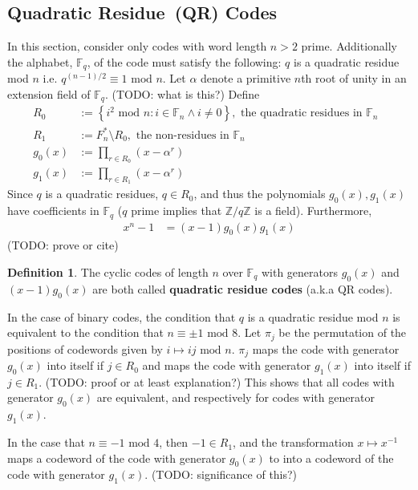 \documentclass{article}
\renewcommand{\tt}[1]{\text{ #1 }}
\newcommand{\Z}{\mathbb{Z}}
\newcommand{\F}{\mathbb{F}}
\renewcommand{\mod}{\text{ mod }}
\newcommand{\mt}{\mapsto}
\renewcommand{\=}{\equiv}
\renewcommand{\i}{^{-1}}
\newcommand{\set}[1]{\left\{ #1 \right\}}
\theoremstyle{plain}
\theoremstyle{definition}
\newtheorem{defn}{Definition}[subsection]
\newcommand{\TODO}[1]{(TODO: #1)}
\begin{document}
\subsection{Quadratic Residue (QR) Codes}

In this section, consider only codes with word length $n > 2$ prime.
Additionally the alphabet, $\F_q$, of the code must satisfy the following: $q$ is a quadratic residue mod $n$ i.e. $q^{(n-1)/2} \= 1 \mod n$.
Let $\alpha$ denote a primitive $n$th root of unity in an extension field of $\F_q$. \TODO{what is this?}
Define
\begin{align}
  R_0 &:= \set{ i^2 \mod n : i \in \F_n \land i \neq 0 }, \tt{the quadratic residues in $\F_n$} \\
  R_1 &:= F_n^* \setminus R_0, \tt{the non-residues in $\F_n$} \\
  g_0(x) &:= \prod_{r \in R_0} (x - \alpha^r) \\
  g_1(x) &:= \prod_{r \in R_1} (x - \alpha^r)
\end{align}
Since $q$ is a quadratic residues, $q \in R_0$, and thus the polynomials $g_0(x), g_1(x)$ have coefficients in $\F_q$ ($q$ prime implies that $\Z/q\Z$ is a field).
Furthermore,
\begin{align}
  x^n - 1 &= (x-1) g_0(x) g_1(x)
\end{align}
\TODO{prove or cite}

\begin{defn}
  The cyclic codes of length $n$ over $\F_q$ with generators $g_0(x)$ and $(x-1)g_0(x)$ are both called \textbf{quadratic residue codes} (a.k.a QR codes).
\end{defn}

In the case of binary codes, the condition that $q$ is a quadratic residue mod $n$ is equivalent to the condition that $n \= \pm 1 \mod 8$.
Let $\pi_{j}$ be the permutation of the positions of codewords given by $i \mt ij \mod n$.
$\pi_j$ maps the code with generator $g_0(x)$ into itself if $j \in R_0$ and maps the code with generator $g_1(x)$ into itself if $j \in R_1$.
\TODO{proof or at least explanation?}
This shows that all codes with generator $g_0(x)$ are equivalent, and respectively for codes with generator $g_1(x)$.

In the case that $n \= -1 \mod 4$, then $-1 \in R_1$, and the transformation $x \mt x\i$ maps a codeword of the code with generator $g_0(x)$ to into a codeword of the code with generator $g_1(x)$.
\TODO{significance of this?}
\end{document}
